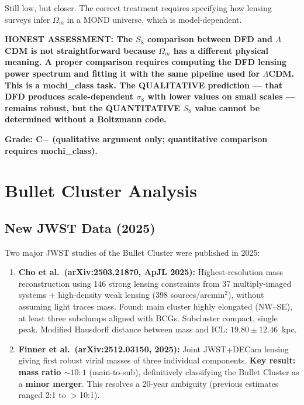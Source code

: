 \documentclass[11pt]{article}
\newcommand{\LCDM}{$\Lambda$CDM}
\newcommand{\Om}{\Omega_m}
\begin{document}
Still low, but closer.  The correct treatment requires specifying how
lensing surveys infer $\Om$ in a MOND universe, which is model-dependent.

\textbf{HONEST ASSESSMENT:  The $S_8$ comparison between DFD and \LCDM{}
is not straightforward because $\Om$ has a different physical meaning.
A proper comparison requires computing the DFD lensing power spectrum
and fitting it with the same pipeline used for \LCDM.  This is a
mochi\_class task.  The QUALITATIVE prediction --- that DFD produces
scale-dependent $\sigma_8$ with lower values on small scales --- remains
robust, but the QUANTITATIVE $S_8$ value cannot be determined without
a Boltzmann code.}

\textbf{Grade: C$-$ (qualitative argument only; quantitative comparison
requires mochi\_class).}

\section{Bullet Cluster Analysis}
\label{sec:bullet}

\subsection{New JWST Data (2025)}

Two major JWST studies of the Bullet Cluster were published in 2025:

\begin{enumerate}
\item \textbf{Cho et al.\ (arXiv:2503.21870, ApJL 2025):}
  Highest-resolution mass reconstruction using 146 strong lensing
  constraints from 37 multiply-imaged systems + high-density weak
  lensing (398 sources/arcmin$^2$), without assuming light traces mass.
  Found: main cluster highly elongated (NW--SE), at least three
  subclumps aligned with BCGs.  Subcluster compact, single peak.
  Modified Hausdorff distance between mass and ICL: $19.80 \pm 12.46$~kpc.

\item \textbf{Finner et al.\ (arXiv:2512.03150, 2025):}
  Joint JWST+DECam lensing giving first robust virial masses of three
  individual components.  \textbf{Key result: mass ratio $\sim 10:1$}
  (main-to-sub), definitively classifying the Bullet Cluster as a
  \textbf{minor merger}.  This resolves a 20-year ambiguity (previous
  estimates ranged 2:1 to $>$10:1).
\end{enumerate}
\end{document}

